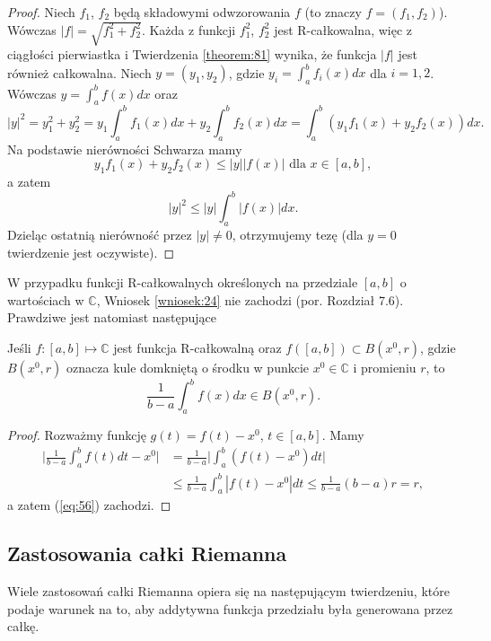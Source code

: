 \documentclass[leqno]{article}
\begin{document}
\begin{justify}
\begin{proof}
    Niech $f_1$, $f_2$ będą składowymi odwzorowania $f$ (to znaczy $f = (f_1, f_2)$).
    Wówczas $|f| = \sqrt{f_1^2+f_2^2}$. Każda z funkcji $f_1^2$, $f_2^2$ jest R-całkowalna, więc z ciągłości
    pierwiastka i Twierdzenia \ref{theorem:81} wynika, że funkcja $|f|$ jest również całkowalna.
    Niech $y = (y_1, y_2)$, gdzie $y_i = \int_{a}^{b}f_i(x)dx$ dla $i = 1,2$. Wówczas
    $y = \int_{a}^{b}f(x)dx$ oraz
    \[
        |y|^2 = y_1^2 + y_2^2 = y_1 \int_{a}^{b}f_1(x)dx + y_2\int_{a}^{b}f_2(x)dx = 
        \int_{a}^{b}(y_1f_1(x) + y_2f_2(x))dx.
    \]
    Na podstawie nierówności Schwarza mamy 
    \[
        y_1f_1(x) + y_2f_2(x) \leqslant |y||f(x)| \text{ dla } x \in [a,b],
    \]
    a zatem
    \[
        |y|^2 \leqslant |y|\int_{a}^{b}|f(x)|dx.
    \]
    Dzieląc ostatnią nierówność przez $|y| \neq 0$, otrzymujemy tezę (dla $y = 0$ twierdzenie jest oczywiste).
\end{proof}

W przypadku funkcji R-całkowalnych określonych na przedziale $[a,b]$ o wartościach w $\mathbb{C}$, Wniosek \ref{wniosek:24}
nie zachodzi (por. Rozdział 7.6). Prawdziwe jest natomiast następujące

\begin{theorem}
{
    Jeśli $f : [a,b] \mapsto \mathbb{C}$ jest funkcja R-całkowalną oraz $f([a,b]) \subset B(x^0, r)$,
    gdzie $B(x^0, r)$ oznacza kule domkniętą o środku w punkcie $x^0 \in \mathbb{C}$ i promieniu $r$, to
    \begin{equation}\label{eq:56}
        \frac{1}{b-a}\int_{a}^{b}f(x)dx \in B(x^0, r).
    \end{equation}
}
\end{theorem}

\begin{proof}
Rozważmy funkcję $g(t) = f(t) - x^0$, $t \in [a,b]$. Mamy
\begin{align*}
    \Bigg|\frac{1}{b-a}\int_{a}^{b}f(t)dt - x^0\Bigg| &= \frac{1}{b-a}\Bigg|\int_{a}^{b}(f(t)-x^0)dt\Bigg| \\
    &\leqslant \frac{1}{b-a}\int_{a}^{b}|f(t)-x^0|dt \leqslant \frac{1}{b-a}(b-a)r = r,
\end{align*}
a zatem (\ref{eq:56}) zachodzi.
\end{proof}

\subsection{Zastosowania całki Riemanna}
Wiele zastosowań całki Riemanna opiera się na następującym twierdzeniu, które podaje warunek na to, aby
addytywna funkcja przedziału była generowana przez całkę. 


\end{justify}
\end{document}
